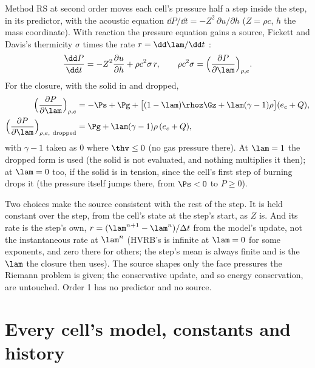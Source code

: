 Method RS at second order moves each cell's pressure half a step inside the
step, in its predictor, with the acoustic equation $\dd P/\dd t =
-Z^2\,\partial u/\partial h$ ($Z = \rho c$, $h$ the mass coordinate). With
reaction the pressure equation gains a source, Fickett and Davis's
thermicity $\sigma$ times the rate $r = \dd\lam/\dd t$
\cite{fickett1979,kittell2020pep}:
\begin{equation}
  \frac{\dd P}{\dd t} = -Z^2\frac{\partial u}{\partial h} + \rho c^2\sigma\, r,
  \qquad
  \rho c^2\sigma = \Bigl(\frac{\partial P}{\partial\lam}\Bigr)_{\rho, e}.
  \label{eq:rs-source}
\end{equation}
For the closure, with the solid in and dropped,
\begin{align}
  \Bigl(\frac{\partial P}{\partial\lam}\Bigr)_{\rho,e}
  &= -\Ps + \Pg + \bigl[(1 - \lam)\rhoz\Gz + \lam(\gamma - 1)\rho\bigr](e_c + Q),
  \label{eq:dpdlam}\\
  \Bigl(\frac{\partial P}{\partial\lam}\Bigr)_{\rho,e,\ \mathrm{dropped}}
  &= \Pg + \lam(\gamma - 1)\rho\,(e_c + Q),
  \label{eq:dpdlam-dropped}
\end{align}
with $\gamma - 1$ taken as 0 where $\thv \le 0$ (no gas pressure there). At
$\lam = 1$ the dropped form is used (the solid is not evaluated, and nothing
multiplies it then); at $\lam = 0$ too, if the solid is in tension, since
the cell's first step of burning drops it (the pressure itself jumps there,
from $\Ps < 0$ to $P \ge 0$).

Two choices make the source consistent with the rest of the step. It is held
constant over the step, from the cell's state at the step's start, as $Z$ is.
And its rate is the step's own, $r = (\lam^{n+1} - \lam^{n})/\Delta t$ from
the model's update, not the instantaneous rate at $\lam^n$ (HVRB's is
infinite at $\lam = 0$ for some exponents, and zero there for others; the
step's mean is always finite and is the $\lam$ the closure then uses). The
source shapes only the face pressures the Riemann problem is given; the
conservative update, and so energy conservation, are untouched. Order 1 has
no predictor and no source.

\section{Every cell's model, constants and history}
\label{sec:burn-table}

